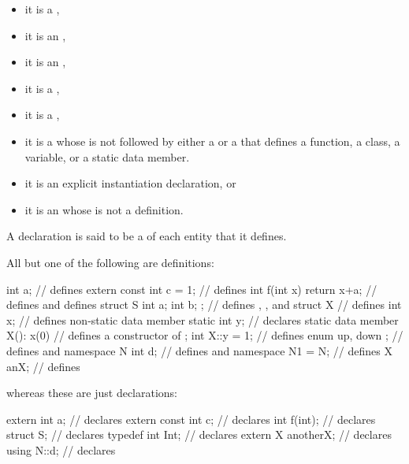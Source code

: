 \begin{itemize}
\item it is
a ,
\item
it is an
,
\item
it is an
,
\item it is
a ,
\item it is
a ,
\item it is
a 
whose  is not followed by
either a  or a 
that defines a function, a class, a variable, or a static data member.
\item it is
an explicit instantiation declaration, or
\item it is
an  whose
 is not a definition.
\end{itemize}
A declaration is said to be a  of each entity that it defines.
\begin{example}
All but one of the following are definitions:
\begin{codeblock}
int a;                          // defines 
extern const int c = 1;         // defines 
int f(int x) { return x+a; }    // defines  and defines 
struct S { int a; int b; };     // defines , , and 
struct X {                      // defines 
  int x;                        // defines non-static data member 
  static int y;                 // declares static data member 
  X(): x(0) { }                 // defines a constructor of 
};
int X::y = 1;                   // defines 
enum { up, down };              // defines  and 
namespace N { int d; }          // defines  and 
namespace N1 = N;               // defines 
X anX;                          // defines 
\end{codeblock}
whereas these are just declarations:
\begin{codeblock}
extern int a;                   // declares 
extern const int c;             // declares 
int f(int);                     // declares 
struct S;                       // declares 
typedef int Int;                // declares 
extern X anotherX;              // declares 
using N::d;                     // declares 
\end{codeblock}
\end{example}

